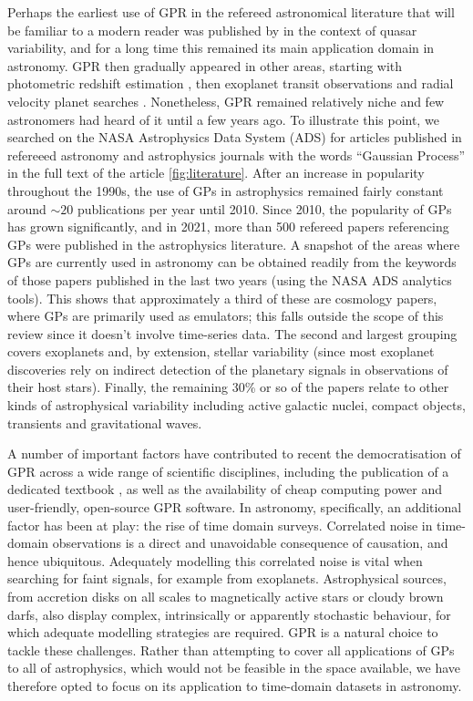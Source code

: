 \documentclass[letterpaper]{ar-1col}
\begin{document}
Perhaps the earliest use of GPR in the refereed astronomical literature that will be familiar to a modern reader was published by \citet{prh92a} in the context of quasar variability, and for a long time this remained its main application domain in astronomy. GPR then gradually appeared in other areas, starting with photometric redshift estimation \citep{2006ApJ...647..102W}, then exoplanet transit observations \citep{2009ApJ...704...51C,2012MNRAS.419.2683G} and radial velocity planet searches \citep{2012MNRAS.419.3147A,2014MNRAS.443.2517H}. Nonetheless, GPR remained relatively niche and few astronomers had heard of it until a few years ago. To illustrate this point, we searched on the NASA Astrophysics Data System (ADS) for articles published in refereeed astronomy and astrophysics journals with the words ``Gaussian Process'' in the full text of the article \autoref{fig:literature}.
After an increase in popularity throughout the 1990s, the use of GPs in astrophysics remained fairly constant around $\sim20$ publications per year until 2010.
Since 2010, the popularity of GPs has grown significantly, and in 2021, more than 500 refereed papers referencing GPs were published in the astrophysics literature. A snapshot of the areas where GPs are currently used in astronomy can be obtained readily from the keywords of those papers published in the last two years (using the NASA ADS analytics tools). This shows that approximately a third of these are cosmology papers, where GPs are primarily used as emulators; this falls outside the scope of this review since it doesn't involve time-series data. The second and largest grouping covers exoplanets and, by extension, stellar variability (since most exoplanet discoveries rely on indirect detection of the planetary signals in observations of their host stars). Finally, the remaining 30\% or so of the papers relate to other kinds of astrophysical variability including active galactic nuclei, compact objects, transients and gravitational waves.

A number of important factors have contributed to recent the democratisation of GPR across a wide range of scientific disciplines, including the publication of a dedicated textbook \citep{gpml}, as well as the availability of cheap computing power and user-friendly, open-source GPR software. In astronomy, specifically, an additional factor has been at play: the rise of time domain surveys. Correlated noise in time-domain observations is a direct and unavoidable consequence of causation, and hence ubiquitous. Adequately modelling this correlated noise is vital when searching for faint signals, for example from exoplanets. Astrophysical sources, from accretion disks on all scales to magnetically active stars or cloudy brown darfs, also display complex, intrinsically or apparently stochastic behaviour, for which adequate modelling strategies are required. GPR is a natural choice to tackle these challenges. Rather than attempting to cover all applications of GPs to all of astrophysics, which would not be feasible in the space available, we have therefore opted to focus on its application to time-domain datasets in astronomy.
\end{document}
